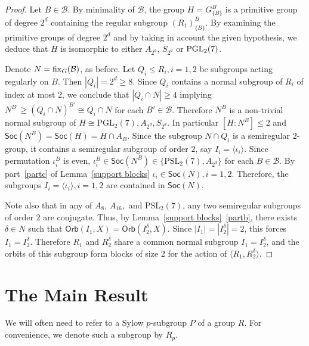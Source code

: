 \documentclass[11pt]{amsart}
\numberwithin{equation}{section}
\theoremstyle{definition}
\def\PGL{{\rm PGL}}
\def\fix{{\rm fix}}
\def\soc{{\mathsf{Soc}}}
\newcommand{\sg}[1]{\langle{#1}\rangle}
\begin{document}
	\begin{proof}
		Let $B \in \mathcal{B}$. By minimality of $\mathcal{B}$, the group 
		$H = G_{\{B\}}^B$ is a primitive group of degree $2^d$ containing the regular subgroup $(R_1)_{\{B\}}^B$. 
		By examining the primitive groups of degree $2^d$ and by taking in account the given hypothesis, we deduce that $H$ is isomorphic to either $A_{2^d}$, $S_{2^d}$ or $\PGL_2(7)$.
		
		Denote $N=\fix_G(\mathcal{B})$, as before. Let $Q_i\leq R_i,i=1,2$ be subgroups 
		acting regularly on $B$. Then $|Q_i|=2^d\geq 8$. Since $Q_i$ contains a normal subgroup of $R_i$ of index at most 2, 
		we conclude that $|Q_i\cap N|\geq 4$ implying 
		$N^{B'}\geq (Q_i\cap N)^{B'}\cong Q_i\cap N$ for each $B'\in \mathcal{B}$. Therefore $N^B$ is a non-trivial normal subgroup of $H\cong \mathrm{PGL}_2(7),A_{2^d}, S_{2^d}$.
		In particular $[H:N^B]\leq 2$ and $\soc(N^B)=\soc(H) = H\cap A_B$.
		Since the subgroup $N\cap Q_i$ is a semiregular $2$-group, it contains a semiregular subgroup of order $2$, say $I_i=\sg{\iota_i}$. Since permutation $\iota_i^B$ is even, $\iota_i^B\in \soc(N^B)\in\{\mathrm{PSL}_2(7),A_{2^d}\}$ for each  $B\in\mathcal{B}$. 
		By part~\eqref{partc} of Lemma~\ref{support blocks} $\iota_i\in\soc(N),i=1,2$. Therefore, the subgroups $I_i=\sg{\iota_i},i=1,2$ are contained in $\soc(N)$. 
		
		Note also that in any of $A_8$, $A_{16},$ and $\mathrm{PSL}_2(7)$, any two semiregular subgroups of order $2$ are conjugate. 
		Thus, by Lemma~\ref{support blocks}~\eqref{partb}, there exists $\delta \in N$ such that
		$
		\mathsf{Orb}(I_1,X) = \mathsf{Orb}(I_2^\delta,X).
		$
		Since $|I_1| = |I_2^\delta| = 2$, this forces $I_1 = I_2^\delta$. 
		Therefore $R_1$ and $R_2^\delta$ share a common normal subgroup $I_1 = I_2^\delta$, and the orbits of this subgroup form blocks of size $2$ for the action of $\langle R_1, R_2^\delta\rangle$.
	\end{proof}
	
	
	\section{The Main Result}\label{sec:main}
	
	We will often need to refer to a Sylow $p$-subgroup $P$ of a group $R$.  
	For convenience, we denote such a subgroup by $R_p$.  
	
\end{document}
